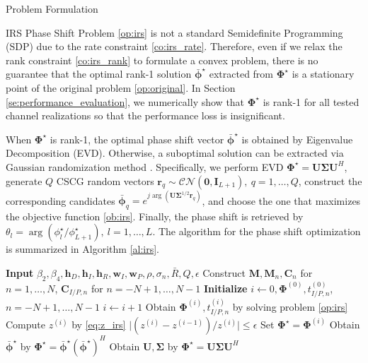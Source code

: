 \documentclass[journal]{IEEEtran}
\begin{document}
\begin{section}{Problem Formulation}
\begin{subsection}{IRS Phase Shift}
		Problem \ref{op:irs} is not a standard Semidefinite Programming (SDP) due to the rate constraint \ref{co:irs_rate}. Therefore, even if we relax the rank constraint \ref{co:irs_rank} to formulate a convex problem, there is no guarantee that the optimal rank-1 solution $\bar{\boldsymbol{\phi}}^{\star}$ extracted from $\boldsymbol{\Phi}^{\star}$ is a stationary point of the original problem \ref{op:original}. In Section \ref{se:performance_evaluation}, we numerically show that $\boldsymbol{\Phi}^{\star}$ is rank-1 for all tested channel realizations so that the performance loss is insignificant.

		When $\boldsymbol{\Phi}^{\star}$ is rank-1, the optimal phase shift vector $\bar{\boldsymbol{\phi}}^\star$ is obtained by Eigenvalue Decomposition (EVD). Otherwise, a suboptimal solution can be extracted via Gaussian randomization method \cite{Huang2010}. Specifically, we perform EVD $\boldsymbol{\Phi}^{\star}=\boldsymbol{U}\boldsymbol{\Sigma}\boldsymbol{U}^H$, generate $Q$ CSCG random vectors $\boldsymbol{r}_q \sim \mathcal{CN}(\boldsymbol{0},\boldsymbol{I}_{L+1}),\ q=1,\dots,Q$, construct the corresponding candidates $\bar{\boldsymbol{\phi}}_q=e^{j\arg\left(\boldsymbol{U}\boldsymbol{\Sigma}^{1/2}\boldsymbol{r}_q\right)}$, and choose the one that maximizes the objective function \ref{ob:irs}. Finally, the phase shift is retrieved by $\theta_l=\arg(\phi_l^\star/\phi_{L+1}^\star), \ l=1,\dots,L$. The algorithm for the phase shift optimization is summarized in Algorithm \ref{al:irs}.
		\begin{algorithm}
			\caption{SCA: IRS Phase Shift}
			\label{al:irs}
			\begin{algorithmic}[1]
				\State \textbf{Input} $\beta_2,\beta_4,\boldsymbol{h}_D,\boldsymbol{h}_I,\boldsymbol{h}_R,\boldsymbol{w}_I,\boldsymbol{w}_P,\rho,\sigma_n,\bar{R},Q,\epsilon$
				\State Construct $\boldsymbol{M},\boldsymbol{M}_n,\boldsymbol{C}_{n}$ for $n=1,\dots,N$, $\boldsymbol{C}_{I/P,n}$ for $n=-N+1,\dots,N-1$
				\State \textbf{Initialize} $i \gets 0,\boldsymbol{\Phi}^{(0)},t_{I/P,n}^{(0)}$, $n=-N+1,\dots,N-1$
				\Repeat
					\State $i \gets i + 1$
					\State Obtain $\boldsymbol{\Phi}^{(i)}, t_{I/P,n}^{(i)}$ by solving problem \ref{op:irs}
					\State Compute $z^{(i)}$ by \ref{eq:z_irs}
				\Until $\lvert (z^{(i)}-z^{(i-1)}) / z^{(i)} \rvert \le \epsilon$
				\State Set $\boldsymbol{\Phi}^{\star}=\boldsymbol{\Phi}^{(i)}$
					\State Obtain $\bar{\boldsymbol{\phi}}^\star$ by $\boldsymbol{\Phi}^{\star}=\bar{\boldsymbol{\phi}}^\star(\bar{\boldsymbol{\phi}}^\star)^H$
				\Else
					\State Obtain $\boldsymbol{U},\boldsymbol{\Sigma}$ by $\boldsymbol{\Phi}^{\star}=\boldsymbol{U}\boldsymbol{\Sigma}\boldsymbol{U}^H$


\end{algorithmic}
\end{algorithm}
\end{subsection}
\end{section}
\end{document}
